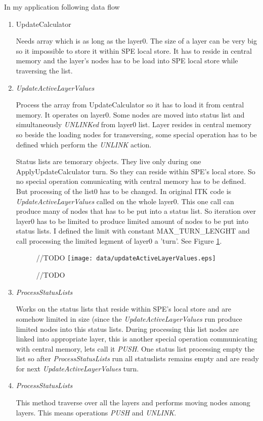 In my application following data flow
\begin{enumerate}
\item UpdateCalculator
\par
Needs array which is as long as the layer0. The size of a layer can be very big
so it impossible to store it within SPE local store. It has to reside in central
memory and the layer's nodes has to be load into SPE local store while
traversing the list.

\item \emph{UpdateActiveLayerValues}
\par
Process the array from UpdateCalculator so it has to load it from central
memory. It operates on layer0. Some nodes are moved into status list and
simultaneously \emph{UNLINKed} from layer0 list. Layer resides in central
memory so beside the loading nodes for transversing, some special operation has
to be defined which perform the \emph{UNLINK} action.
\par
Status lists are temorary objects. They live
only during one ApplyUpdateCalculator turn. So they can reside within SPE's
local store. So no special operation comunicating with central memory has to be
defined. But processing of the list0 has to be changed. In original ITK code is
\emph{UpdateActiveLayerValues} called on the whole layer0. This one call can
produce many of nodes that has to be put into a status list. So iteration over
layer0 has to be limited to produce limited amount of nodes to be put into
status lists. I defined the limit with constant MAX_TURN_LENGHT and call
processing the limited legment of layer0 a 'turn'. See Figure
\ref{fg:updateActiveLayerValues}.

\begin{figure}	//TODO
    \centering
    \texttt{[image: data/updateActiveLayerValues.eps]}
    \caption[Diagram of new design components]{//TODO}
    \label{fg:updateActiveLayerValues}
\end{figure}

\item \emph{ProcessStatusLists}
\par
Works on the status lists that reside within SPE's local store and are somehow
limited in size (since the \emph{UpdateActiveLayerValues} run produce limited
nodes into this status lists. During processing this list nodes are linked into
appropriate layer, this is another special operation communicating with central
memory, lets call it \emph{PUSH}. One status list processing empty the list
so after \emph{ProcessStatusLists} run all statuslists remains
empty and are ready for next \emph{UpdateActiveLayerValues} turn.

\item \emph{ProcessStatusLists}
\par
This method traverse over all the layers and performs moving nodes among
layers. This means operations \emph{PUSH} and \emph{UNLINK}.
\end{enumerate}

